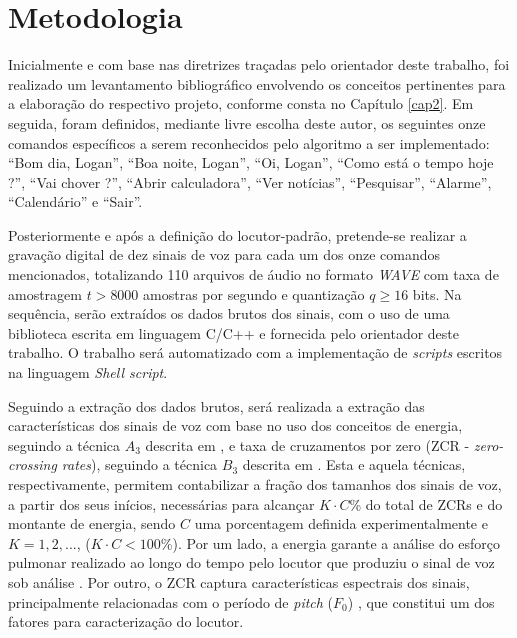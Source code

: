 \documentclass[a4paper,12pt,twoside,openright]{report}
\begin{document}
\section{Metodologia}
\par Inicialmente e com base nas diretrizes tra\c{c}adas pelo orientador deste trabalho, foi realizado um levantamento bibliogr\'{a}fico envolvendo os conceitos pertinentes para a elabora\c{c}\~{a}o do respectivo projeto, conforme consta no Cap\'{i}tulo \ref{cap2}. Em seguida, foram definidos, mediante livre escolha deste autor, os seguintes onze comandos espec\'{i}ficos a serem reconhecidos pelo algoritmo a ser implementado: ``Bom dia, Logan'', ``Boa noite, Logan'', ``Oi, Logan'', ``Como est\'{a} o tempo hoje ?'', ``Vai chover ?'', ``Abrir calculadora'', ``Ver not\'{i}cias'', ``Pesquisar'', ``Alarme'', ``Calend\'{a}rio'' e ``Sair''. 
\\
\par Posteriormente e ap\'{o}s a defini\c{c}\~{a}o do locutor-padr\~{a}o, pretende-se realizar a grava\c{c}\~{a}o digital de dez sinais de voz para cada um dos onze comandos mencionados, totalizando 110 arquivos de \'{a}udio no formato  \textit{WAVE} com taxa de amostragem $t > 8000$ amostras por segundo e quantiza\c{c}\~{a}o $q \geqslant 16$ bits. Na sequ\^{e}ncia, ser\~{a}o extra\'{i}dos os dados brutos dos sinais, com o uso de uma biblioteca escrita em linguagem C/C++ e fornecida pelo orientador deste trabalho. O trabalho ser\'{a} automatizado com a implementa\c{c}\~{a}o de \textit{scripts} escritos na linguagem \textit{Shell script}.
\\
\par Seguindo a extra\c{c}\~{a}o dos dados brutos, ser\'{a} realizada a extra{\c c}\~{a}o das caracter\'{i}sticas dos sinais de voz com base no uso dos conceitos de energia, seguindo a t\'{e}cnica $A_3$ descrita em \cite{tut_energia}, e taxa de cruzamentos por zero (ZCR - \textit{zero-crossing rates}), seguindo a t\'{e}cnica $B_3$ descrita em \cite{tut_zcr}. Esta e aquela t\'{e}cnicas, respectivamente, permitem contabilizar a fra\c{c}\~{a}o dos tamanhos dos sinais de voz, a partir dos seus in\'{i}cios, necess\'{a}rias para alcan\c{c}ar $K \cdot C$\% do total de ZCRs e do montante de energia, sendo $C$ uma porcentagem definida experimentalmente e $K = 1, 2, ...$, ($K \cdot C < 100$\%). Por um lado, a energia garante a an\'{a}lise do esfor\c{c}o pulmonar realizado ao longo do tempo pelo locutor que produziu o sinal de voz sob an\'{a}lise \cite{deng}. Por outro, o ZCR captura caracter\'{i}sticas espectrais dos sinais, principalmente relacionadas com o per\'{i}odo de \textit{pitch} ($F_0$) \cite{deng}, que constitui um dos fatores para caracteriza\c{c}\~{a}o do locutor. 
\end{document}
